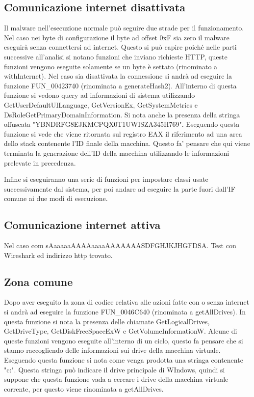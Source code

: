 \documentclass[]{article}
\begin{document}
\subsection{Comunicazione internet disattivata}
Il malware nell'esecuzione normale può seguire due strade per il funzionamento. Nel caso nei byte di configurazione il byte ad offset 0xF sia zero il malware eseguirà senza connettersi ad internet. Questo si può capire poiché nelle parti successive all'analisi si notano funzioni che inviano richieste HTTP, queste funzioni vengono eseguite solamente se un byte è settato (rinominato a withInternet). 
Nel caso sia disattivata la connessione si andrà ad eseguire la funzione FUN\_00423740 (rinominata a generateHash2). All'interno di questa funzione si vedono query ad informazioni di sistema utilizzando GetUserDefaultUILanguage, GetVersionEx, GetSystemMetrics e DsRoleGetPrimaryDomainInformation. Si nota anche la presenza della stringa offuscata "YBNDRFG8EJKMCPQX0T1UWISZA345H769". Eseguendo questa funzione si vede che viene ritornata sul registro EAX il riferimento ad una area dello stack contenente l'ID finale della macchina. Questo fa' pensare che qui viene terminata la generazione dell'ID della macchina utilizzando le informazioni prelevate in precedenza.

Infine si eseguiranno una serie di funzioni per impostare classi usate successivamente dal sistema, per poi andare ad eseguire la parte fuori dall'IF comune ai due modi di esecuzione.  

\subsection{Comunicazione internet attiva}
Nel caso com sAaaaaaAAAAaaaaAAAAAAASDFGHJKJHGFDSA. Test con Wireshark ed indirizzo http trovato.

\subsection{Zona comune}
Dopo aver eseguito la zona di codice relativa alle azioni fatte con o senza internet si andrà ad eseguire la funzione FUN\_0046C640 (rinominata a getAllDrives). In questa funzione si nota la presenza delle chiamate GetLogicalDrives, GetDriveType, GetDiskFreeSpaceExW e GetVolumeInformationW. Alcune di queste funzioni vengono eseguite all'interno di un ciclo, questo fa pensare che si stanno raccogliendo delle informazioni sui drive della macchina virtuale. Eseguendo questa funzione si nota come venga prodotta una stringa contenente "c:". Questa stringa può indicare il drive principale di WIndows, quindi si suppone che questa funzione vada a cercare i drive della macchina virtuale corrente, per questo viene rinominata a getAllDrives.
\end{document}
